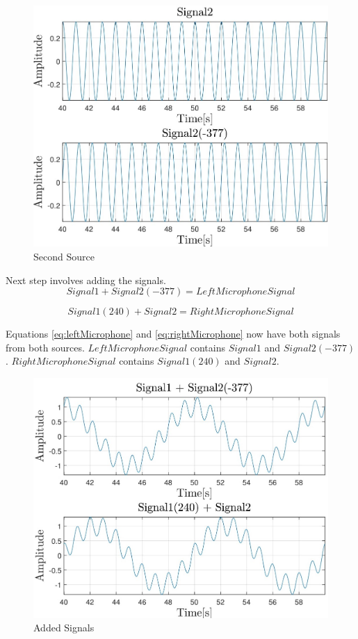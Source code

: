 \begin{figure}[htp]
	\centering
	\includegraphics[width=\textwidth]{Illustrations/source2.jpg}
	\caption{Second Source}
	\label{fig:source2}
\end{figure}
Next step involves adding the signals.
\begin{equation}
	Signal1 + Signal2(-377) = LeftMicrophoneSignal
	\label{eq:leftMicrophone}
\end{equation}

\begin{equation}
	Signal1(240) + Signal2 = RightMicrophoneSignal
	\label{eq:rightMicrophone}
\end{equation}

Equations \ref{eq:leftMicrophone} and \ref{eq:rightMicrophone} now have both 
signals from both sources.
\newpage
$LeftMicrophoneSignal$ contains $Signal1$ and $Signal2(-377)$. $RightMicrophoneSignal$ contains 
$Signal1(240)$ and $Signal2$.
\begin{figure}[htp]
	\centering
	\includegraphics[width=\textwidth]{Illustrations/source1And2.jpg}
	\caption{Added Signals}
	\label{fig:source1And2}
\end{figure}

